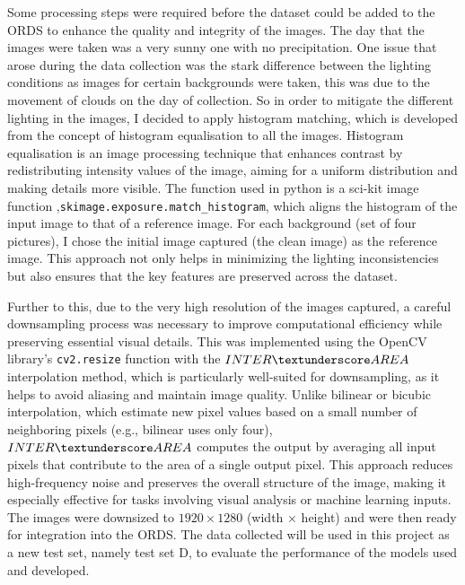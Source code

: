 \documentclass[11pt]{ociamthesis}  %
\begin{document}
Some processing steps were required before the dataset could be added to the ORDS to enhance the quality and integrity of the images. The day that the images were taken was a very sunny one with no precipitation. One issue that arose during the data collection was the stark difference between the lighting conditions as images for certain backgrounds were taken, this was due to the movement of clouds on the day of collection. So in order to mitigate the different lighting in the images, I decided to apply histogram matching\cite{scikit-image}, which is developed from the concept of histogram equalisation\cite{1975ieht.rept.....H} to all the images. Histogram equalisation is an image processing technique that enhances contrast by redistributing intensity values of the image, aiming for a uniform distribution and making details more visible. The function used in python is a sci-kit image function ,\texttt{skimage.exposure.match\_histogram}, which aligns the histogram of the input image to that of a reference image. For each background (set of four pictures), I chose the initial image captured (the clean image) as the reference image. This approach not only helps in minimizing the lighting inconsistencies but also ensures that the key features are preserved across the dataset.

Further to this, due to the very high resolution of the images captured, a careful downsampling process was necessary to improve computational efficiency while preserving essential visual details. This was implemented using the OpenCV\cite{opencv_library} library’s \texttt{cv2.resize} function with the \texttt{$INTER\textunderscore AREA$} interpolation method, which is particularly well-suited for downsampling, as it helps to avoid aliasing and maintain image quality. Unlike bilinear or bicubic interpolation, which estimate new pixel values based on a small number of neighboring pixels (e.g., bilinear uses only four), \texttt{$INTER\textunderscore AREA$} computes the output by averaging all input pixels that contribute to the area of a single output pixel. This approach reduces high-frequency noise and preserves the overall structure of the image, making it especially effective for tasks involving visual analysis or machine learning inputs\cite{opencv_library}. The images were downsized to $1920 \times 1280$ (width × height) and were then ready for integration into the ORDS. The data collected will be used in this project as a new test set, namely test set D, to evaluate the performance of the models used and developed.
\end{document}
